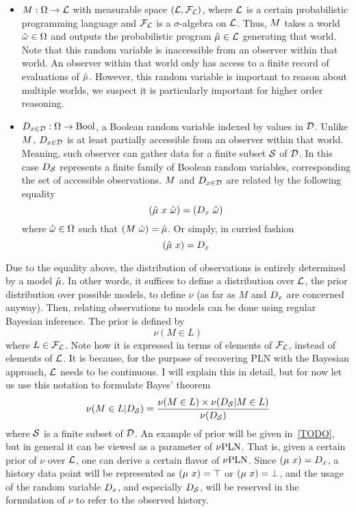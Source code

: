 \documentclass[]{article}
\begin{document}
\begin{itemize}
\item $M : \Omega \to \mathcal{L}$ with measurable space
  $(\mathcal{L}, \mathcal{F}_{\mathcal{L}})$, where $\mathcal{L}$ is a certain
  probabilistic programming language and $\mathcal{F}_{\mathcal{L}}$ is a
  $\sigma$-algebra on $\mathcal{L}$.  Thus, $M$ takes a world
  $\hat{\omega} \in \Omega$ and outputs the probabilistic program $\hat{\mu}
  \in \mathcal{L}$ generating that world.  Note that this random
  variable is inaccessible from an observer within that world.  An
  observer within that world only has access to a finite record of
  evaluations of $\hat{\mu}$.  However, this random variable is important
  to reason about multiple worlds, we suspect it is particularly
  important for higher order reasoning.
\item $D_{x\in\mathcal{D}} : \Omega \to \textup{Bool}$, a Boolean random variable indexed
  by values in $\mathcal{D}$.  Unlike $M$, $D_{x\in\mathcal{D}}$ is at least
  partially accessible from an observer within that world.  Meaning,
  such observer can gather data for a finite subset $\mathcal{S}$ of
  $\mathcal{D}$.  In this case $D_{\mathcal{S}}$ represents a finite family of
  Boolean random variables, corresponding the set of accessible
  observations.  $M$ and $D_{x\in\mathcal{D}}$ are related by the following
  equality
  $$(\anymu\ x\ \anyomega) = (\Datax\ \anyomega)$$ where $\hat{\omega}
  \in \Omega$ such that $(M\ \hat{\omega}) = \hat{\mu}$.  Or simply, in
  curried fashion
  $$(\hat{\mu}\ x) = D_x$$
\end{itemize}
Due to the equality above, the distribution of observations is
entirely determined by a model $\hat{\mu}$.  In other words, it suffices
to define a distribution over $\mathcal{L}$, the prior distribution over
possible models, to define $\nu$ (as far as $M$ and $D_x$ are
concerned anyway).  Then, relating observations to models can be done
using regular Bayesian inference.  The prior is defined by
$$\nu(M \in L)$$ where $L \in \mathcal{F}_{\mathcal{L}}$.  Note how it is
expressed in terms of elements of $\mathcal{F}_{\mathcal{L}}$, instead of
elements of $\mathcal{L}$.  It is because, for the purpose of recovering
PLN with the Bayesian approach, $\mathcal{L}$ needs to be continuous.  I
will explain this in detail, but for now let us use this notation to
formulate Bayes' theorem
$$\nu(M \in L | D_{\mathcal{S}}) = \frac{\nu(M \in L) \times \nu(D_{\mathcal{S}} | M \in
  L)}{\nu(D_{\mathcal{S}})}$$ where $\mathcal{S}$ is a finite subset of
$\mathcal{D}$.  An example of prior will be given in~\ref{TODO}, but in
general it can be viewed as a parameter of $\nu\textup{PLN}$.  That is, given a
certain prior of $\nu$ over $\mathcal{L}$, one can derive a certain
flavor of $\nu\textup{PLN}$.  Since $(\mu\ x) = D_x$, a history data point
will be represented as $(\mu\ x) = \top$ or $(\mu\ x) = \bot$, and the
usage of the random variable $D_x$, and especially $D_{\mathcal{S}}$, will
be reserved in the formulation of $\nu$ to refer to the observed
history.
\end{document}
